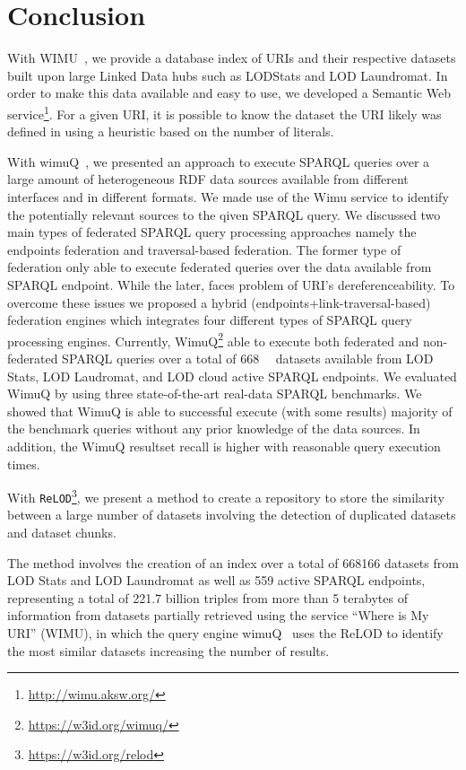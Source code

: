 \documentclass[sw]{iosart2x}
\begin{document}
\section{Conclusion}
\label{sec:conc}

With WIMU~\cite{valdestilhas2018my}, we provide a database index of URIs and their respective datasets built upon large Linked Data hubs such as LODStats and LOD Laundromat.
In order to make this data available and easy to use, we developed a Semantic Web service\footnote{\url{http://wimu.aksw.org/}}.
For a given URI, it is possible to know the dataset the URI likely was defined in using a heuristic based on the number of literals.

With wimuQ~\cite{valdestilhas2019more}, we presented an approach to execute SPARQL queries over a large amount of heterogeneous RDF data sources available from different interfaces and in different formats. We made use of the Wimu service to identify the potentially relevant sources to the qiven SPARQL query. We discussed two main types of federated SPARQL query processing approaches namely the endpoints federation and traversal-based federation. The former type of federation only able to execute federated queries over the data available from SPARQL endpoint. While the later, faces problem of URI's dereferenceability. To overcome these issues we proposed a hybrid (endpoints+link-traversal-based) federation engines which integrates four different types of SPARQL query processing engines. Currently, WimuQ\footnote{\url{https://w3id.org/wimuq/}} able to execute both federated and non-federated SPARQL queries over a total of \SI{668}{\kilo\nothing} datasets available from LOD Stats, LOD Laudromat, and LOD cloud active SPARQL endpoints. We evaluated WimuQ by using three state-of-the-art real-data SPARQL benchmarks. We showed that WimuQ is able to successful execute (with some results) majority of the benchmark queries without any prior knowledge of the data sources. In addition, the WimuQ resultset recall is higher with reasonable query execution times. 

With \texttt{ReLOD}\footnote{\url{https://w3id.org/relod}}, we present a method to create a repository to store the similarity between a large number of datasets involving the detection of duplicated datasets and dataset chunks.

The method involves the creation of an index over a total of \num{668166} datasets from LOD Stats and LOD Laundromat as well as 559 active SPARQL endpoints, representing a total of 221.7 billion triples from more than 5 terabytes of information from datasets partially retrieved using the service ``Where is My URI'' (WIMU)\cite{valdestilhas2018my}, in which the query engine wimuQ~\cite{valdestilhas2019more} uses the ReLOD to identify the most similar datasets increasing the number of results. 
\end{document}
